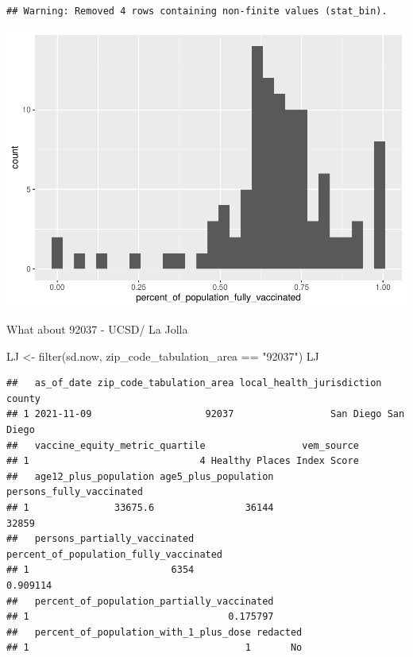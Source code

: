 \documentclass[
]{article}
\newenvironment{Shaded}{\begin{snugshade}}{\end{snugshade}}
\newcommand{\FunctionTok}[1]{\textcolor[rgb]{0.00,0.00,0.00}{#1}}
\newcommand{\NormalTok}[1]{#1}
\newcommand{\OtherTok}[1]{\textcolor[rgb]{0.56,0.35,0.01}{#1}}
\newcommand{\SpecialCharTok}[1]{\textcolor[rgb]{0.00,0.00,0.00}{#1}}
\newcommand{\StringTok}[1]{\textcolor[rgb]{0.31,0.60,0.02}{#1}}
\begin{document}
\begin{verbatim}
## Warning: Removed 4 rows containing non-finite values (stat_bin).
\end{verbatim}

\includegraphics{Vaccine-rate-mini-project_files/figure-latex/unnamed-chunk-26-1.pdf}

What about 92037 - UCSD/ La Jolla

\begin{Shaded}
\begin{Highlighting}[]
\NormalTok{LJ }\OtherTok{\textless{}{-}} \FunctionTok{filter}\NormalTok{(sd.now, zip\_code\_tabulation\_area }\SpecialCharTok{==} \StringTok{"92037"}\NormalTok{)}
\NormalTok{LJ}
\end{Highlighting}
\end{Shaded}

\begin{verbatim}
##   as_of_date zip_code_tabulation_area local_health_jurisdiction    county
## 1 2021-11-09                    92037                 San Diego San Diego
##   vaccine_equity_metric_quartile                 vem_source
## 1                              4 Healthy Places Index Score
##   age12_plus_population age5_plus_population persons_fully_vaccinated
## 1               33675.6                36144                    32859
##   persons_partially_vaccinated percent_of_population_fully_vaccinated
## 1                         6354                               0.909114
##   percent_of_population_partially_vaccinated
## 1                                   0.175797
##   percent_of_population_with_1_plus_dose redacted
## 1                                      1       No
\end{verbatim}
\end{document}

